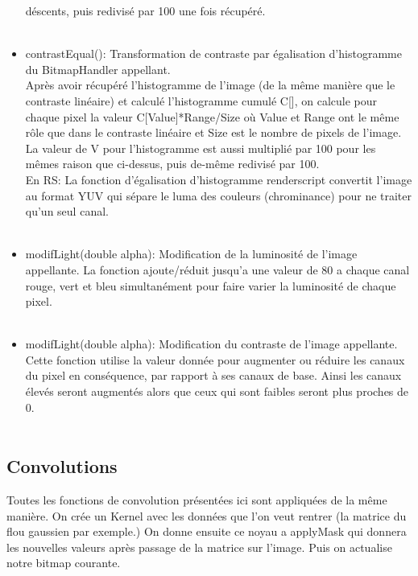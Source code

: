 \documentclass[12pt]{article}
\begin{document}
\begin{itemize}
        déscents, puis redivisé par 100 une fois récupéré.\\
        \\
        \item contrastEqual():
        Transformation de contraste par égalisation d'histogramme du BitmapHandler appellant.\\
        Après avoir récupéré l'histogramme de l'image (de la même manière que le contraste linéaire) et calculé l'histogramme cumulé C[],
        on calcule pour chaque pixel la valeur C[Value]*Range/Size où Value et Range ont le même rôle que dans le contraste linéaire 
        et Size est le nombre de pixels de l'image. La valeur de V pour l'histogramme est aussi multiplié par 100 
        pour les mêmes raison que ci-dessus, puis de-même redivisé par 100.\\
        En RS: La fonction d'égalisation d'histogramme renderscript convertit l'image au format YUV qui sépare le luma des couleurs (chrominance) pour ne traiter qu'un seul canal.\\
        \\
        \item modifLight(double alpha):   
        Modification de la luminosité de l'image appellante.
        La fonction ajoute/réduit jusqu'a une valeur de 80 a chaque canal rouge, vert et bleu simultanément pour faire varier la luminosité de chaque pixel.\\
        \\
        \item modifLight(double alpha):   
        Modification du contraste de l'image appellante.
        Cette fonction utilise la valeur donnée pour augmenter ou réduire les canaux du pixel en conséquence, par rapport à ses canaux de base. Ainsi les canaux élevés seront augmentés alors que ceux qui sont faibles seront plus proches de 0.\\
        \\
    \end{itemize}

    \subsection{Convolutions}
        Toutes les fonctions de convolution présentées ici sont appliquées de la même manière.
        On crée un Kernel avec les données que l'on veut rentrer (la matrice du flou gaussien par exemple.)
        On donne ensuite ce noyau a applyMask qui donnera les nouvelles valeurs après passage de la matrice sur l'image.
        Puis on actualise notre bitmap courante.
\end{document}
